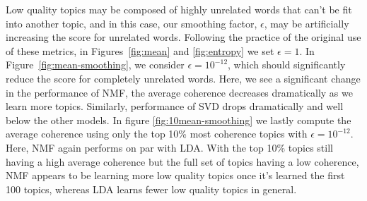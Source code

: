 Low quality topics may be composed of highly unrelated words that
can't be fit into another topic, and in this case, our smoothing
factor, $\epsilon$, may be artificially increasing the score for
unrelated words. Following the practice of the original use of these
metrics, in Figures~\ref{fig:mean} and \ref{fig:entropy} we set
$\epsilon = 1$. In Figure~\ref{fig:mean-smoothing}, we consider
$\epsilon = 10^{-12}$, which should significantly reduce the score for
completely unrelated words. Here, we see a significant change in the
performance of NMF, the average coherence decreases dramatically as we
learn more topics. Similarly, performance of SVD drops dramatically
and well below the other models. In figure \ref{fig:10mean-smoothing}
we lastly compute the average coherence using only the top 10\% most
coherence topics with $\epsilon = 10^{-12}$. Here, NMF again performs
on par with LDA. With the top 10\% topics still having a high average
coherence but the full set of topics having a low coherence, NMF
appears to be learning more low quality topics once it's learned the
first 100 topics, whereas LDA learns fewer low quality topics in
general.

